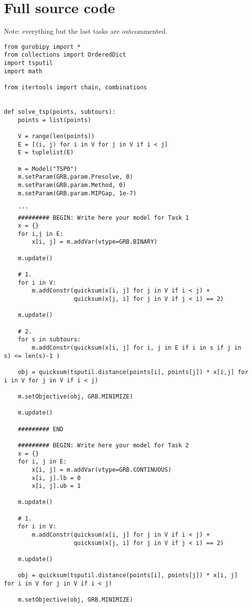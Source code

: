 \documentclass[a4paper,10pt]{article}
\begin{document}
\newpage
\section*{Full source code}
Note: everything but the last tasks are outcommented.
\begin{lstlisting}
from gurobipy import *
from collections import OrderedDict
import tsputil
import math

from itertools import chain, combinations


def solve_tsp(points, subtours):
    points = list(points)

    V = range(len(points))
    E = [(i, j) for i in V for j in V if i < j]
    E = tuplelist(E)

    m = Model("TSP0")
    m.setParam(GRB.param.Presolve, 0)
    m.setParam(GRB.param.Method, 0)
    m.setParam(GRB.param.MIPGap, 1e-7)

    '''
    ######### BEGIN: Write here your model for Task 1
    x = {}
    for i,j in E:
        x[i, j] = m.addVar(vtype=GRB.BINARY)

    m.update()

    # 1.
    for i in V:
        m.addConstr(quicksum(x[i, j] for j in V if i < j) +
                    quicksum(x[j, i] for j in V if j < i) == 2)

    m.update()

    # 2.
    for s in subtours:
        m.addConstr(quicksum(x[i, j] for i, j in E if i in s if j in s) <= len(s)-1 )

    obj = quicksum(tsputil.distance(points[i], points[j]) * x[i,j] for i in V for j in V if i < j)

    m.setObjective(obj, GRB.MINIMIZE)

    m.update()

    ######### END

    ######### BEGIN: Write here your model for Task 2
    x = {}
    for i, j in E:
        x[i, j] = m.addVar(vtype=GRB.CONTINUOUS)
        x[i, j].lb = 0
        x[i, j].ub = 1

    m.update()

    # 1.
    for i in V:
        m.addConstr(quicksum(x[i, j] for j in V if i < j) +
                    quicksum(x[j, i] for j in V if j < i) == 2)

    m.update()

    obj = quicksum(tsputil.distance(points[i], points[j]) * x[i, j] for i in V for j in V if i < j)

    m.setObjective(obj, GRB.MINIMIZE)


\end{lstlisting}
\end{document}
